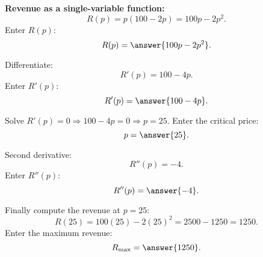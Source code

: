 \documentclass{ximera}
\begin{document}
\begin{solution}
\textbf{Revenue as a single-variable function:}
\[
R(p)=p(100-2p)=100p-2p^2.
\]
Enter \(R(p)\):
\[
R(p)=\answer{100p-2p^2}.
\]

Differentiate:
\[
R'(p)=100-4p.
\]
Enter \(R'(p)\):
\[
R'(p)=\answer{100-4p}.
\]

Solve \(R'(p)=0\Rightarrow 100-4p=0\Rightarrow p=25\).
Enter the critical price:
\[
p=\answer{25}.
\]

Second derivative:
\[
R''(p)=-4.
\]
Enter \(R''(p)\):
\[
R''(p)=\answer{-4}.
\]
\begin{multipleChoice}
\end{multipleChoice}

Finally compute the revenue at \(p=25\):
\[
R(25)=100(25)-2(25)^2 = 2500 - 1250 = 1250.
\]
Enter the maximum revenue:
\[
R_{\max}=\answer{1250}.
\]
\end{solution}
\end{document}
